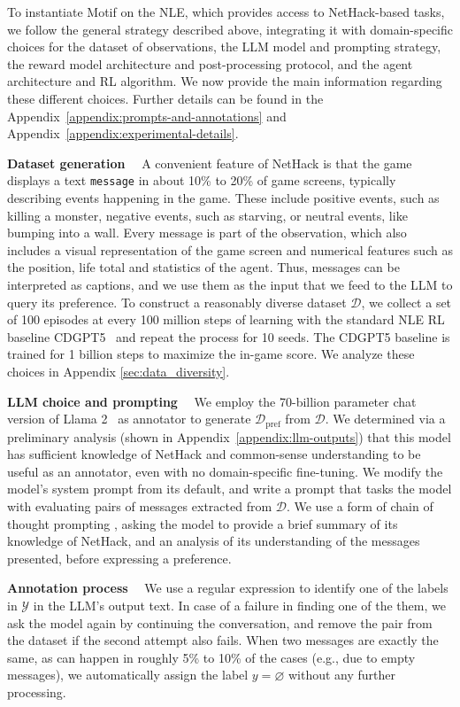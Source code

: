 \documentclass{article} %
\begin{document}
To instantiate Motif on the NLE, which provides access to NetHack-based tasks, we follow the general strategy described above, integrating it with domain-specific choices for the dataset of observations, the LLM model and prompting strategy, the reward model architecture and post-processing protocol, and the agent architecture and RL algorithm. 
We now provide the main information regarding these different choices. Further details can be found in the Appendix~\ref{appendix:prompts-and-annotations} and Appendix~\ref{appendix:experimental-details}.


\textbf{Dataset generation}~~
A convenient feature of NetHack is that the game displays a text \texttt{message} in about 10\% to 20\% of game screens, typically describing  events happening in the game.
These include positive events, such as killing a monster, negative events, such as starving, or neutral events, like bumping into a wall.
Every message is part of the observation, which also includes a visual representation of the game screen and numerical features such as the position, life total and statistics of the agent.
Thus, messages can be interpreted as captions, and we use them as the input that we feed to the 
LLM to query its preference.
To construct a reasonably diverse dataset $\mathcal D$, we collect a set of 100 episodes at every 100 million steps of learning with the standard NLE RL baseline CDGPT5~\citep{miffyli2022} and repeat the process for 10 seeds. The CDGPT5 baseline is trained for 1 billion steps to maximize the in-game score. We analyze these choices in Appendix \ref{sec:data_diversity}.

\textbf{LLM choice and prompting}~~
We employ the 70-billion parameter chat version of Llama 2~\citep{touvron2023llama} as annotator to generate $\mathcal{D}_\text{pref}$ from $\mathcal{D}$.
We determined via a preliminary analysis (shown in Appendix~\ref{appendix:llm-outputs}) that this model has sufficient knowledge of NetHack and common-sense understanding to be useful as an annotator, even with no domain-specific fine-tuning.
We modify the model's system prompt from its default, and write a prompt that tasks the model with evaluating pairs of messages extracted from $\mathcal D$.
We use a form of chain of thought prompting \citep{wei2022chain}, asking the model to provide a brief summary of its knowledge of NetHack, and an analysis of its understanding of the messages presented, before expressing a preference.

\textbf{Annotation process}~~
We use a regular expression to identify one of the labels in $\mathcal Y$ in the LLM's output text. 
In case of a failure in finding one of the them, we ask the model again by continuing the conversation, and remove the pair from the dataset if the second attempt also fails.
When two messages are exactly the same, as can happen in roughly 5\% to 10\% of the cases (e.g., due to empty messages), we automatically assign the label $y = \varnothing $ without any further processing.
\end{document}
